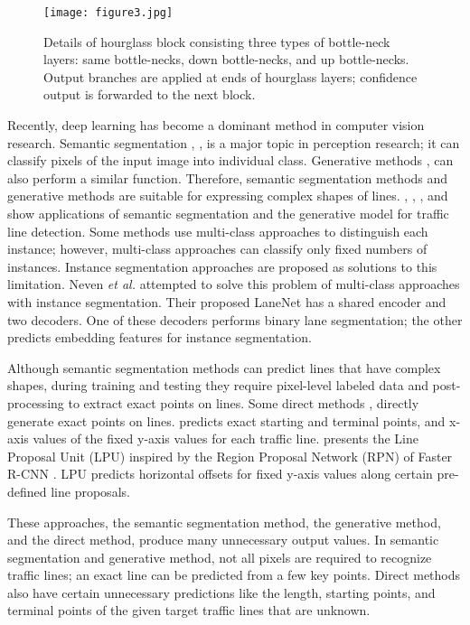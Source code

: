 \documentclass[journal]{IEEEtran}
\begin{document}
\begin{figure*}
    \centering
    \texttt{[image: figure3.jpg]}
    \caption{Details of hourglass block consisting three types of bottle-neck layers: same bottle-necks, down bottle-necks, and up bottle-necks. Output branches are applied at ends of hourglass layers; confidence output is forwarded to the next block.}
\end{figure*}

Recently, deep learning has become a dominant method in computer vision research. Semantic segmentation \cite{badrinarayanan2017segnet}, \cite{paszke2016enet}, \cite{ronneberger2015u} \cite{choi2020adfnet} is a major topic in perception research; it can classify pixels of the input image into individual class. Generative methods \cite{goodfellow2014generative}, \cite{zhu2017unpaired} can also perform a similar function. Therefore, semantic segmentation methods and generative methods are suitable for expressing complex shapes of lines. \cite{pan2018spatial}, \cite{hou2019learning}, \cite{lo2019multi}, and \cite{ghafoorian2018gan} show applications of semantic segmentation and the generative model for traffic line detection. Some methods use multi-class approaches to distinguish each instance; however, multi-class approaches can classify only fixed numbers of instances. Instance segmentation approaches are proposed as solutions to this limitation. Neven \textit{et al.} \cite{neven2018towards} attempted to solve this problem of multi-class approaches with instance segmentation. Their proposed LaneNet has a shared encoder and two decoders. One of these decoders performs binary lane segmentation; the other predicts embedding features for instance segmentation.


Although semantic segmentation methods can predict lines that have complex shapes, during training and testing they require pixel-level labeled data and post-processing to extract exact points on lines. Some direct methods \cite{chen2019pointlanenet}, \cite{8624563} directly generate exact points on lines. \cite{chen2019pointlanenet} predicts exact starting and terminal points,  and x-axis values of the fixed y-axis values for each traffic line. \cite{8624563} presents the Line Proposal Unit (LPU) inspired by the Region Proposal Network (RPN) of Faster R-CNN \cite{ren2015faster}. LPU predicts horizontal offsets for fixed y-axis values along certain pre-defined line proposals.

These approaches, the semantic segmentation method, the generative method, and the direct method, produce many unnecessary output values. In semantic segmentation and generative method, not all pixels are required to recognize traffic lines; an exact line can be predicted from a few key points. Direct methods also have certain unnecessary predictions like the length, starting points, and terminal points of the given target traffic lines that are unknown.
\end{document}
